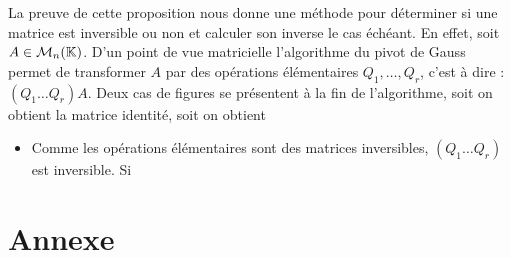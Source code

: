 \documentclass{book}
\begin{document}
\begin{Remarque}
La preuve de cette proposition nous donne une méthode pour déterminer si une matrice est inversible ou non et calculer son inverse le cas échéant. En effet, soit $A\in\mathcal{M}_{n}(\mathbb{K})$. D'un point de vue matricielle l'algorithme du pivot de Gauss permet de transformer $A$ par des opérations élémentaires $Q_1,\dots,Q_r$, c'est à dire :
 $(Q_1\dots Q_r)A$. Deux cas de figures se présentent à la fin de l'algorithme, soit on obtient la matrice identité, soit on obtient 
\begin{itemize}
\item  Comme les opérations élémentaires sont des matrices inversibles, $(Q_1\dots Q_r)$ est inversible. Si 
\end{itemize}
\end{Remarque}



\section{Annexe}
\end{document}
